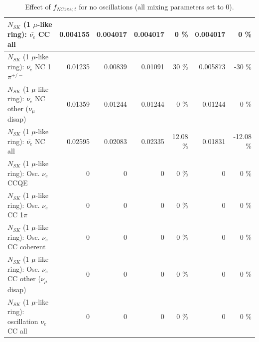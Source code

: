 \begin{table}
\begin{tabular}{| l | r | r | r  r | r  r |}
                            $N_{SK}$ (1 $\mu$-like ring): $\bar{\nu_{e}}$ CC all &        0.004155 &        0.004017 &        0.004017 &        0 \%  &        0.004017 &        0 \%  \\ 
\hline
                     $N_{SK}$ (1 $\mu$-like ring): $\bar{\nu_e}$ NC 1$\pi^{+/-}$ &         0.01235 &         0.00839 &         0.01091 &       30 \%  &        0.005873 &      -30 \%  \\ 
          $N_{SK}$ (1 $\mu$-like ring): $\bar{\nu_e}$ NC other ($\nu_\mu$ disap) &         0.01359 &         0.01244 &         0.01244 &        0 \%  &         0.01244 &        0 \%  \\ 
                            $N_{SK}$ (1 $\mu$-like ring): $\bar{\nu_{e}}$ NC all &         0.02595 &         0.02083 &         0.02335 &    12.08 \%  &         0.01831 &   -12.08 \%  \\ 
\hline
\hline
\hline
                                 $N_{SK}$ (1 $\mu$-like ring): Osc. $\nu_e$ CCQE &               0 &               0 &               0 &        0 \%  &               0 &        0 \%  \\ 
                            $N_{SK}$ (1 $\mu$-like ring): Osc. $\nu_e$ CC 1$\pi$ &               0 &               0 &               0 &        0 \%  &               0 &        0 \%  \\ 
                          $N_{SK}$ (1 $\mu$-like ring): Osc. $\nu_e$ CC coherent &               0 &               0 &               0 &        0 \%  &               0 &        0 \%  \\ 
           $N_{SK}$ (1 $\mu$-like ring): Osc. $\nu_e$ CC other ($\nu_\mu$ disap) &               0 &               0 &               0 &        0 \%  &               0 &        0 \%  \\ 
                        $N_{SK}$ (1 $\mu$-like ring): oscillation $\nu_e$ CC all &               0 &               0 &               0 &        0 \%  &               0 &        0 \%  \\ 
\hline
\hline
\end{tabular}
\caption{ Effect of $f_{NC1\pi^\pm; t}$ for no oscillations (all mixing parameters set to 0). }
\label{tab:num_xsec_norm_nc1piC_1RmuT_3f_osc_t13:0}
\end{table}
\clearpage
